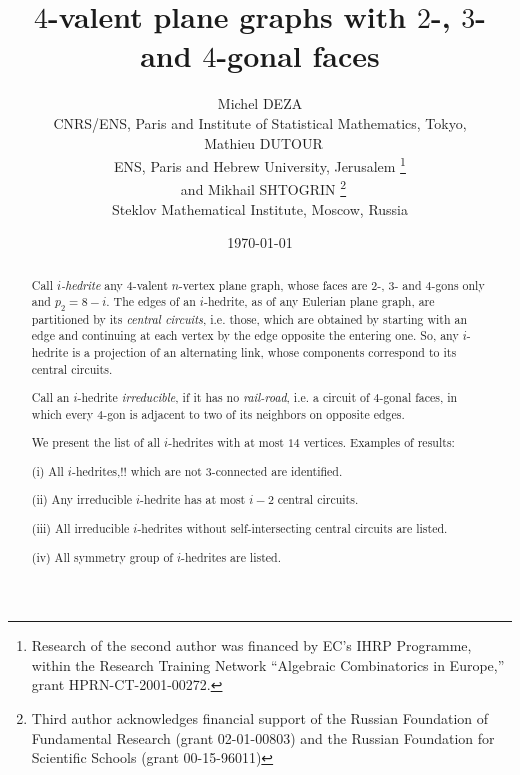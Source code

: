 \documentclass[12pt]{article}
\begin{document}
\title{$4$-valent plane graphs with $2$-, $3$- and $4$-gonal faces}


\author{Michel DEZA \\
  CNRS/ENS, Paris and Institute of Statistical Mathematics, 
Tokyo,\\
\ Mathieu DUTOUR \\
 ENS, Paris and Hebrew University, Jerusalem
\footnote{Research of the second author was financed by EC's IHRP Programme, within the Research Training Network ``Algebraic Combinatorics in Europe,'' grant HPRN-CT-2001-00272.}\\
\ and  Mikhail SHTOGRIN \thanks{Third author acknowledges financial support 
of the Russian Foundation of Fundamental Research (grant 02-01-00803)
and the Russian Foundation for Scientific Schools (grant 00-15-96011)}\\
Steklov Mathematical Institute, Moscow, Russia} 
\date{\today}

\maketitle



\begin{abstract}
Call {\em $i$-hedrite} any $4$-valent $n$-vertex plane graph, whose 
faces are $2$-, $3$- and $4$-gons only and $p_2=8-i$. The edges of an $i$-hedrite, as of 
any Eulerian plane graph, are partitioned
by its {\em central circuits}, i.e. those, which are obtained by starting with an
edge and continuing at each vertex by the edge opposite the entering one. 
So, any $i$-hedrite is a projection of an alternating link, whose components
correspond to its central circuits.

Call an $i$-hedrite {\em irreducible}, if it has no 
{\em rail-road}, i.e. a 
circuit of $4$-gonal faces, in which every $4$-gon is adjacent to two of its 
neighbors on opposite edges.

We present the list of all $i$-hedrites with at most $14$ vertices. Examples of results: 

(i) All $i$-hedrites,!! which are not $3$-connected are identified.

(ii) Any irreducible $i$-hedrite has at most $i-2$ central circuits.

(iii) All irreducible $i$-hedrites without self-intersecting central circuits are listed.

(iv) All symmetry group of $i$-hedrites are listed.

\end{abstract}
\end{document}
